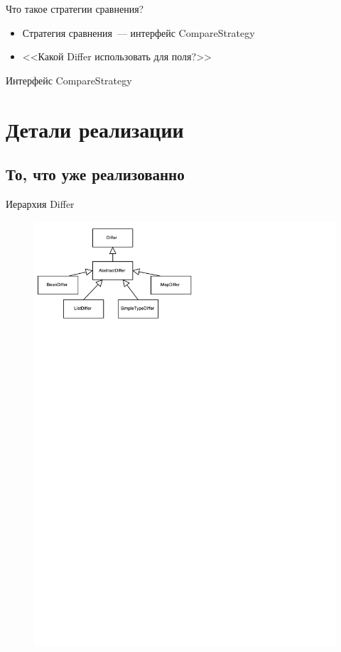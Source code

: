 \documentclass{beamer}
\begin{document}
\begin{frame}{Что такое стратегии сравнения?}
    \pause
    \begin{itemize}
        \item {Стратегия сравнения~--- интерфейс CompareStrategy \pause}
        \item {<<Какой Differ использовать для поля?>>}
    \end{itemize}
\end{frame}

\begin{frame}{Интерфейс CompareStrategy}
    
\end{frame}

\section{Детали реализации}

\subsection{То, что уже реализованно}

\begin{frame}{Иерархия Differ}
    \begin{figure}
        \begin{center}
            \includegraphics{differ-diagram.pdf}
        \end{center}
    \end{figure}
\end{frame}
\end{document}
